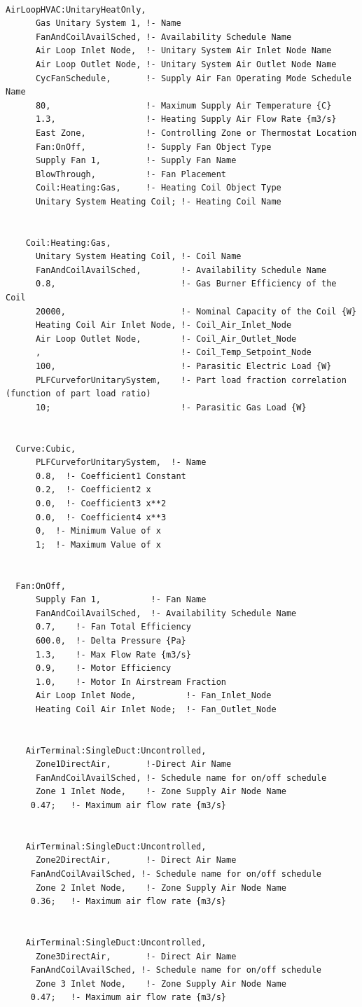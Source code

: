\begin{lstlisting}

AirLoopHVAC:UnitaryHeatOnly,
      Gas Unitary System 1, !- Name
      FanAndCoilAvailSched, !- Availability Schedule Name
      Air Loop Inlet Node,  !- Unitary System Air Inlet Node Name
      Air Loop Outlet Node, !- Unitary System Air Outlet Node Name
      CycFanSchedule,       !- Supply Air Fan Operating Mode Schedule Name
      80,                   !- Maximum Supply Air Temperature {C}
      1.3,                  !- Heating Supply Air Flow Rate {m3/s}
      East Zone,            !- Controlling Zone or Thermostat Location
      Fan:OnOff,            !- Supply Fan Object Type
      Supply Fan 1,         !- Supply Fan Name
      BlowThrough,          !- Fan Placement
      Coil:Heating:Gas,     !- Heating Coil Object Type
      Unitary System Heating Coil; !- Heating Coil Name


    Coil:Heating:Gas,
      Unitary System Heating Coil, !- Coil Name
      FanAndCoilAvailSched,        !- Availability Schedule Name
      0.8,                         !- Gas Burner Efficiency of the Coil
      20000,                       !- Nominal Capacity of the Coil {W}
      Heating Coil Air Inlet Node, !- Coil_Air_Inlet_Node
      Air Loop Outlet Node,        !- Coil_Air_Outlet_Node
      ,                            !- Coil_Temp_Setpoint_Node
      100,                         !- Parasitic Electric Load {W}
      PLFCurveforUnitarySystem,    !- Part load fraction correlation (function of part load ratio)
      10;                          !- Parasitic Gas Load {W}


  Curve:Cubic,
      PLFCurveforUnitarySystem,  !- Name
      0.8,  !- Coefficient1 Constant
      0.2,  !- Coefficient2 x
      0.0,  !- Coefficient3 x**2
      0.0,  !- Coefficient4 x**3
      0,  !- Minimum Value of x
      1;  !- Maximum Value of x


  Fan:OnOff,
      Supply Fan 1,          !- Fan Name
      FanAndCoilAvailSched,  !- Availability Schedule Name
      0.7,    !- Fan Total Efficiency
      600.0,  !- Delta Pressure {Pa}
      1.3,    !- Max Flow Rate {m3/s}
      0.9,    !- Motor Efficiency
      1.0,    !- Motor In Airstream Fraction
      Air Loop Inlet Node,          !- Fan_Inlet_Node
      Heating Coil Air Inlet Node;  !- Fan_Outlet_Node


    AirTerminal:SingleDuct:Uncontrolled,
      Zone1DirectAir,       !-Direct Air Name
      FanAndCoilAvailSched, !- Schedule name for on/off schedule
      Zone 1 Inlet Node,    !- Zone Supply Air Node Name
     0.47;   !- Maximum air flow rate {m3/s}


    AirTerminal:SingleDuct:Uncontrolled,
      Zone2DirectAir,       !- Direct Air Name
     FanAndCoilAvailSched, !- Schedule name for on/off schedule
      Zone 2 Inlet Node,    !- Zone Supply Air Node Name
     0.36;   !- Maximum air flow rate {m3/s}


    AirTerminal:SingleDuct:Uncontrolled,
      Zone3DirectAir,       !- Direct Air Name
     FanAndCoilAvailSched, !- Schedule name for on/off schedule
      Zone 3 Inlet Node,    !- Zone Supply Air Node Name
     0.47;   !- Maximum air flow rate {m3/s}
\end{lstlisting}

